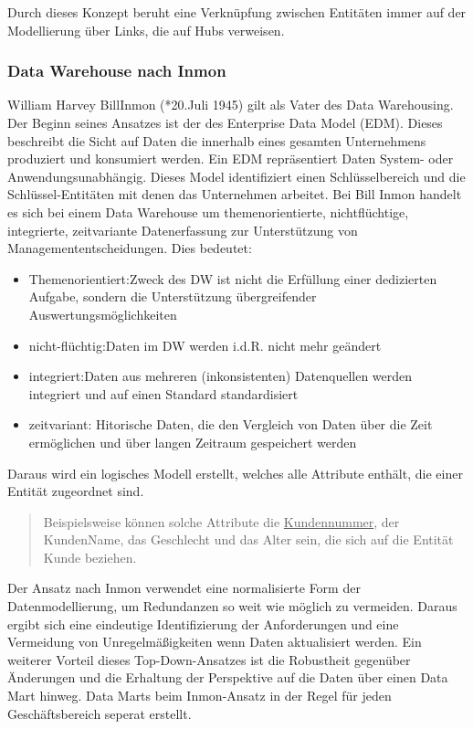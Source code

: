 Durch dieses Konzept beruht eine Verknüpfung zwischen Entitäten immer auf der Modellierung über Links, die auf Hubs verweisen. 
\cite{Wikipedia:Data_Vault}\cite{DDA:Data_Vault}\cite{DL:Data_Vault}\cite{taod:Data_Vault}

\subsubsection{Data Warehouse nach Inmon}
William Harvey \glqq Bill\grqq Inmon (*20.Juli 1945) gilt als \glqq Vater des Data Warehousing\grqq\cite{Wikipedia:Inmon}. Der Beginn seines Ansatzes ist der des \glqq Enterprise Data Model (EDM)\grqq. Dieses beschreibt die Sicht auf Daten die innerhalb eines gesamten Unternehmens produziert und konsumiert werden. Ein EDM repräsentiert Daten System- oder Anwendungsunabhängig.\cite{TDAN:EDM} Dieses Model identifiziert einen Schlüsselbereich und die Schlüssel-Entitäten mit denen das Unternehmen arbeitet. Bei Bill Inmon handelt es sich bei einem Data Warehouse um \glqq themenorientierte, nichtflüchtige, integrierte, zeitvariante Datenerfassung zur Unterstützung von Managemententscheidungen\grqq. Dies bedeutet:
\begin{itemize}
	\item {Themenorientiert:}\newline Zweck des DW ist nicht die Erfüllung einer dedizierten Aufgabe, sondern die Unterstützung übergreifender Auswertungsmöglichkeiten
	 \item{nicht-flüchtig:}\newline Daten im DW werden i.d.R. nicht mehr geändert
	 \item{integriert:}\newline Daten aus mehreren (inkonsistenten) Datenquellen werden integriert und auf einen Standard standardisiert
	 \item {zeitvariant:} \newline Hitorische Daten, die den Vergleich von Daten über die Zeit ermöglichen und über langen Zeitraum gespeichert werden
\end{itemize}
Daraus wird ein logisches Modell erstellt, welches alle Attribute enthält, die einer  Entität zugeordnet sind.
\begin{quote}
	Beispielsweise können solche Attribute die \underline{Kundennummer}, der KundenName, das Geschlecht und das Alter sein, die sich auf die Entität Kunde beziehen.\cite{ITEW:DataWarehouse}
\end{quote}
Der Ansatz nach Inmon verwendet eine normalisierte Form der Datenmodellierung, um Redundanzen so weit wie möglich zu vermeiden. Daraus ergibt sich eine eindeutige Identifizierung der Anforderungen und eine Vermeidung von Unregelmäßigkeiten wenn Daten aktualisiert werden. Ein weiterer Vorteil dieses Top-Down-Ansatzes ist die Robustheit gegenüber Änderungen und die Erhaltung der Perspektive auf die Daten über einen Data Mart hinweg.
Data Marts beim Inmon-Ansatz in der Regel für jeden Geschäftsbereich seperat erstellt.
\cite{Wikipedia:Inmon}\cite{Astera:Kimmball_Inmon}
